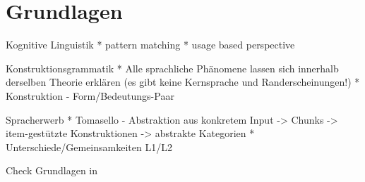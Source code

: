 \section{Grundlagen}

Kognitive Linguistik
* pattern matching
* usage based perspective

Konstruktionsgrammatik
* Alle sprachliche Phänomene lassen sich innerhalb derselben Theorie erklären (es gibt keine Kernsprache und Randerscheinungen!)
* Konstruktion - Form/Bedeutungs-Paar


Spracherwerb
* Tomasello - Abstraktion aus konkretem Input -> Chunks -> item-gestützte Konstruktionen -> abstrakte Kategorien
* Unterschiede/Gemeinsamkeiten L1/L2

Check Grundlagen in \cite{Ziem13}
